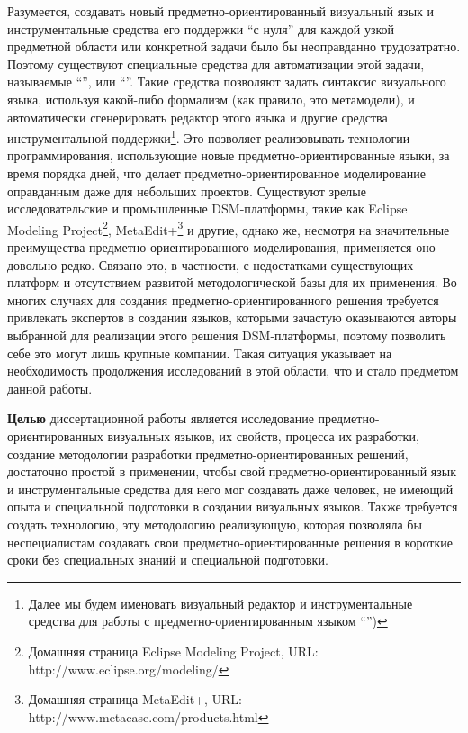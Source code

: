 Разумеется, создавать новый предметно-ориентированный визуальный язык и 
инструментальные средства его поддержки "`с нуля"' для каждой узкой предметной 
области или конкретной задачи было бы неоправданно трудозатратно. Поэтому 
существуют специальные средства для автоматизации этой задачи, называемые 
"`"', или "`"'. Такие средства позволяют задать 
синтаксис визуального языка, используя какой-либо формализм (как правило, 
это метамодели), и автоматически сгенерировать редактор этого языка и другие средства инструментальной 
поддержки\footnote{Далее мы будем именовать визуальный редактор и инструментальные средства для работы с предметно-ориентированным языком "`"')}. 
Это позволяет реализовывать технологии программирования, использующие новые предметно-ориентированные языки, за время 
порядка дней, что делает предметно-ориентированное моделирование оправданным 
даже для небольших проектов. Существуют зрелые исследовательские и промышленные 
DSM-платформы, такие как Eclipse Modeling 
Project\footnote{Домашняя страница Eclipse Modeling Project, URL: http://www.eclipse.org/modeling/},
MetaEdit+\footnote{Домашняя страница MetaEdit+, URL: http://www.metacase.com/products.html} 
и другие, однако же, несмотря на значительные преимущества предметно-ориентированного 
моделирования, применяется оно довольно редко. Связано это, в частности, с 
недостатками существующих платформ и отсутствием развитой методологической 
базы для их применения. 
Во многих случаях для создания предметно-ориентированного 
решения требуется привлекать экспертов в создании языков, которыми зачастую 
оказываются авторы выбранной для реализации этого решения DSM-платформы, поэтому 
позволить себе это могут лишь крупные компании. Такая ситуация указывает на 
необходимость продолжения исследований в этой области, что и стало предметом 
данной работы.

\textbf{Целью} диссертационной работы является исследование предметно-ориентированных 
визуальных языков, их свойств, процесса их разработки, создание методологии 
разработки предметно-ориентированных решений, достаточно простой в применении, 
чтобы свой предметно-ориентированный язык и инструментальные средства для него 
мог создавать даже человек, не имеющий опыта и специальной подготовки в создании 
визуальных языков. Также требуется создать технологию, эту методологию 
реализующую, которая позволяла бы неспециалистам создавать свои 
предметно-ориентированные решения в короткие сроки без специальных знаний и 
специальной подготовки. 


